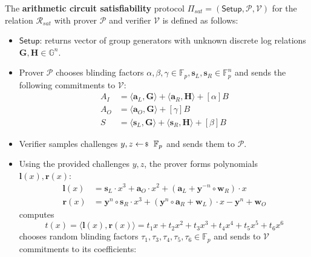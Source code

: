 \documentclass[../../book.tex]{subfiles}
\begin{document}
\begin{definition}
    The \textbf{arithmetic circuit satisfiability} protocol $\Pi_{sat} = (\mathsf{Setup}, \mathcal{P}, \mathcal{V})$ for the relation $\mathcal{R}_{sat}$ with prover $\mathcal{P}$ and verifier $\mathcal{V}$ is defined as follows:
    \begin{itemize}
        \item $\mathsf{Setup}$: returns vector of group generators with unknown discrete log relations $\mathbf{G,H} \in \mathbb{G}^n$.
        \item Prover $\mathcal{P}$ chooses blinding factors $\alpha, \beta, \gamma \in \mathbb{F}_p, \mathbf{s}_L, \mathbf{s}_R \in \mathbb{F}_p^n$ and sends the following commitments to $\mathcal{V}$:
        \begin{equation*}
            \begin{aligned}
                A_I &= \langle \mathbf{a}_L, \mathbf{G} \rangle + \langle \mathbf{a}_R, \mathbf{H} \rangle + [\alpha]B\\
                A_O &= \langle \mathbf{a}_O, \mathbf{G} \rangle + [\gamma]B\\
                S &= \langle \mathbf{s}_L, \mathbf{G} \rangle + \langle \mathbf{s}_R, \mathbf{H} \rangle + [\beta]B
            \end{aligned}
        \end{equation*}
        \item Verifier samples challenges $y,z \leftarrowS \mathbb{F}_p$ and sends them to $\mathcal{P}$.
        \item Using the provided challenges $y,z$, the prover forms polynomials $\mathbf{l}(x), \mathbf{r}(x)$:
        \begin{equation*}
            \begin{aligned}
                \mathbf{l}(x) &= \mathbf{s}_L \cdot x^3 + \mathbf{a}_O \cdot x^2 + (\mathbf{a}_L + \mathbf{y}^{-n} \circ \mathbf{w}_R) \cdot x \\
                \mathbf{r}(x) &= \mathbf{y}^n \circ \mathbf{s}_R \cdot x^3 + (\mathbf{y}^n \circ \mathbf{a}_R +  \mathbf{w}_L) \cdot x - \mathbf{y}^n + \mathbf{w}_O
            \end{aligned}
        \end{equation*}
        computes $$t(x) = \langle \mathbf{l}(x), \mathbf{r}(x) \rangle = t_1 x + t_2 x^2 + t_3 x^3 + t_4 x^4 + t_5 x^5 + t_6 x^6$$
        chooses random blinding factors $\tau_1, \tau_3, \tau_4, \tau_5, \tau_6 \in \mathbb{F}_p$ and sends to $\mathcal{V}$ commitments to its coefficients:

\end{itemize}
\end{definition}
\end{document}
